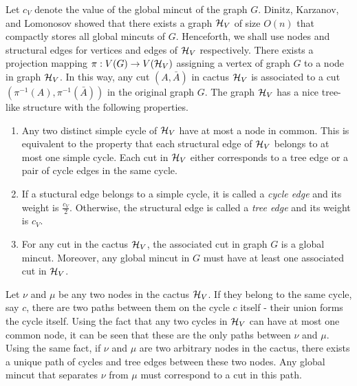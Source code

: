 Let $c_V$ denote the value of the global mincut of the graph $G$.
Dinitz, Karzanov, and Lomonosov \cite{DL76} showed that there exists a graph ${\cal H}_V$ of size $O(n)$ that compactly stores all global mincuts of $G$. 
Henceforth, we shall use nodes and structural edges for vertices and edges of ${\cal H}_V$ respectively. There exists a projection mapping $\pi:V(G)\rightarrow V({\cal H}_V)$ assigning a vertex of graph $G$ to a node in graph ${\cal H}_V$. In this way, any cut $(A,{\bar A})$ in cactus ${\cal H}_V$ is associated to a cut $(\pi^{-1}(A),\pi^{-1}(\bar A))$ in the original graph $G$.
The graph ${\cal H}_V$ has a nice tree-like structure with the following properties.
\begin{enumerate}
    \item Any two distinct simple cycle of ${\cal H}_V$ have at most a node in common. This is equivalent to the property that each structural edge of ${\cal H}_V$ belongs to at most one simple cycle. Each cut in ${\cal H}_V$ either corresponds to a tree edge or a pair of cycle edges in the same cycle.
    \item If a stuctural edge belongs to a simple cycle, it is called a \textit{cycle edge} and its weight is $\frac{c_V}{2}$. Otherwise, the structural edge is called a \textit{tree edge} and its weight is $c_V$.
    \item For any cut in the cactus ${\cal H}_V$, the associated cut in graph $G$ is a global mincut. Moreover, any global mincut in $G$ must have at least one associated cut in ${\cal H}_V$.
\end{enumerate}

Let $\nu$ and $\mu$ be any two nodes in the cactus ${\cal H}_V$. If they belong to the same cycle, say $c$, there are two paths between them on the cycle $c$ itself - their union forms the cycle itself. Using the fact that any two cycles in  ${\cal H}_V$ can have at most one common node, it can be seen that these are the only paths between $\nu$ and $\mu$. Using the same fact, if $\nu$ and $\mu$ are two arbitrary nodes in the cactus, there exists a unique path of cycles and tree edges between these two nodes. Any global mincut that separates $\nu$ from $\mu$ must correspond to a cut in this path.

